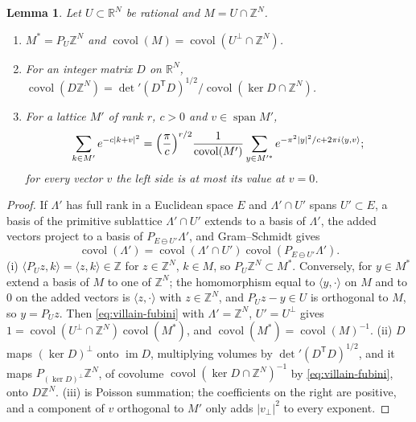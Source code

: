 \documentclass[11pt,a4paper]{amsart}
\newtheorem{lemma}[theorem]{Lemma}
\theoremstyle{definition}
\theoremstyle{remark}
\numberwithin{equation}{section}
\newcommand{\R}{\mathbb{R}}          %
\newcommand{\Z}{\mathbb{Z}}          %
\newcommand{\ip}[2]{\langle #1,#2\rangle}  %
\newcommand{\abs}[1]{\lvert #1\rvert}      %
\begin{document}
\begin{lemma}\label{lem:villain-lattice}
Let $U\subset\R^N$ be rational and $M=U\cap\Z^N$.
\begin{enumerate}[label=(\roman*),leftmargin=2.2em]
\item $M^*=P_U\Z^N$ and $\operatorname{covol}(M)=\operatorname{covol}(U^\perp\cap\Z^N)$.
\item For an integer matrix $D$ on $\R^N$, $\operatorname{covol}(D\Z^N)=\det{}'(D^{\mathsf T}D)^{1/2}/\operatorname{covol}(\ker D\cap\Z^N)$.
\item For a lattice $M'$ of rank $r$, $c>0$ and $v\in\operatorname{span}M'$,
\[
\sum_{k\in M'}e^{-c\abs{k+v}^2}=\Bigl(\frac\pi c\Bigr)^{r/2}\frac1{\operatorname{covol}(M')}\sum_{y\in M'^*}e^{-\pi^2\abs y^2/c+2\pi i\ip yv};
\]
for every vector $v$ the left side is at most its value at $v=0$.
\end{enumerate}
\end{lemma}

\begin{proof}
If $\Lambda'$ has full rank in a Euclidean space $E$ and $\Lambda'\cap U'$ spans $U'\subset E$, a basis of the primitive sublattice $\Lambda'\cap U'$ extends to a basis of $\Lambda'$, the added vectors project to a basis of $P_{E\ominus U'}\Lambda'$, and Gram--Schmidt gives
\begin{equation}\label{eq:villain-fubini}
\operatorname{covol}(\Lambda')=\operatorname{covol}(\Lambda'\cap U')\operatorname{covol}(P_{E\ominus U'}\Lambda').
\end{equation}
(i) $\ip{P_Uz}k=\ip zk\in\Z$ for $z\in\Z^N$, $k\in M$, so $P_U\Z^N\subset M^*$. Conversely, for $y\in M^*$ extend a basis of $M$ to one of $\Z^N$; the homomorphism equal to $\ip y\cdot$ on $M$ and to $0$ on the added vectors is $\ip z\cdot$ with $z\in\Z^N$, and $P_Uz-y\in U$ is orthogonal to $M$, so $y=P_Uz$. Then \eqref{eq:villain-fubini} with $\Lambda'=\Z^N$, $U'=U^\perp$ gives $1=\operatorname{covol}(U^\perp\cap\Z^N)\operatorname{covol}(M^*)$, and $\operatorname{covol}(M^*)=\operatorname{covol}(M)^{-1}$. (ii) $D$ maps $(\ker D)^\perp$ onto $\operatorname{im}D$, multiplying volumes by $\det{}'(D^{\mathsf T}D)^{1/2}$, and it maps $P_{(\ker D)^\perp}\Z^N$, of covolume $\operatorname{covol}(\ker D\cap\Z^N)^{-1}$ by \eqref{eq:villain-fubini}, onto $D\Z^N$. (iii) is Poisson summation; the coefficients on the right are positive, and a component of $v$ orthogonal to $M'$ only adds $\abs{v_\perp}^2$ to every exponent.
\end{proof}
\end{document}
